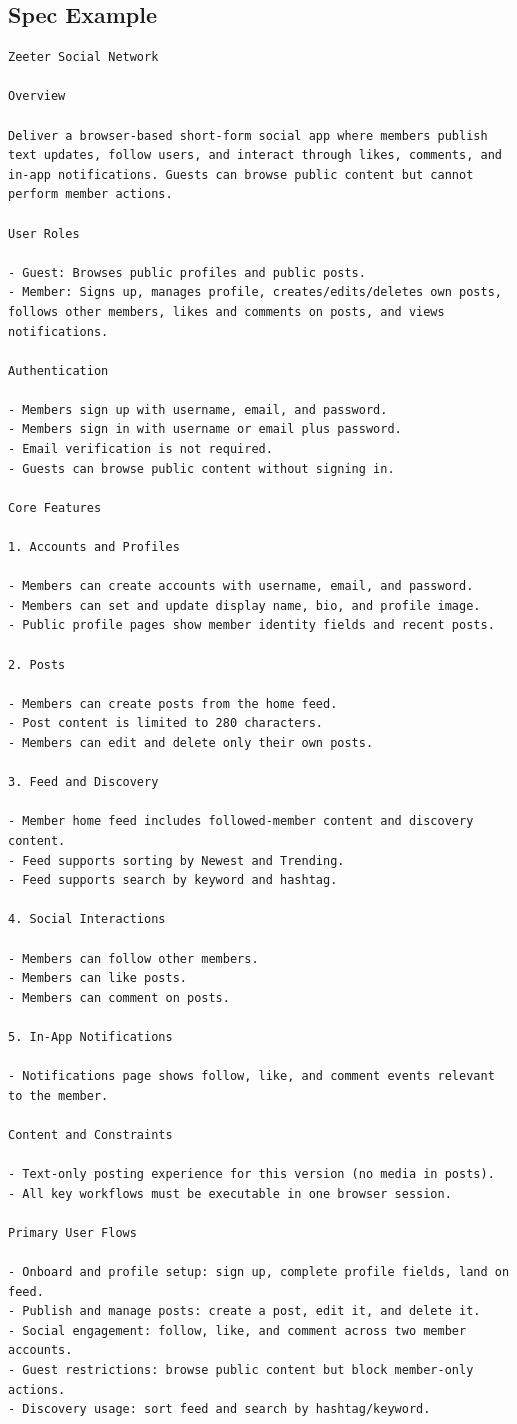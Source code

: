 \subsection{Spec Example}
\label{sec:appendix-spec-example}
\begin{lstlisting}
Zeeter Social Network

Overview

Deliver a browser-based short-form social app where members publish text updates, follow users, and interact through likes, comments, and in-app notifications. Guests can browse public content but cannot perform member actions.

User Roles

- Guest: Browses public profiles and public posts.
- Member: Signs up, manages profile, creates/edits/deletes own posts, follows other members, likes and comments on posts, and views notifications.

Authentication

- Members sign up with username, email, and password.
- Members sign in with username or email plus password.
- Email verification is not required.
- Guests can browse public content without signing in.

Core Features

1. Accounts and Profiles

- Members can create accounts with username, email, and password.
- Members can set and update display name, bio, and profile image.
- Public profile pages show member identity fields and recent posts.

2. Posts

- Members can create posts from the home feed.
- Post content is limited to 280 characters.
- Members can edit and delete only their own posts.

3. Feed and Discovery

- Member home feed includes followed-member content and discovery content.
- Feed supports sorting by Newest and Trending.
- Feed supports search by keyword and hashtag.

4. Social Interactions

- Members can follow other members.
- Members can like posts.
- Members can comment on posts.

5. In-App Notifications

- Notifications page shows follow, like, and comment events relevant to the member.

Content and Constraints

- Text-only posting experience for this version (no media in posts).
- All key workflows must be executable in one browser session.

Primary User Flows

- Onboard and profile setup: sign up, complete profile fields, land on feed.
- Publish and manage posts: create a post, edit it, and delete it.
- Social engagement: follow, like, and comment across two member accounts.
- Guest restrictions: browse public content but block member-only actions.
- Discovery usage: sort feed and search by hashtag/keyword.

\end{lstlisting}


